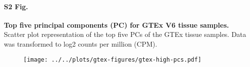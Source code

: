 \documentclass[10pt,letterpaper]{article}
\begin{document}
\paragraph*{S2 Fig.}

\label{figS2}
{\bf Top five principal components (PC) for GTEx V6 tissue samples.} Scatter plot representation of the top five PCs of the GTEx tissue samples. Data was transformed to log2 counts per million (CPM).
\begin{figure}[ht]
\centering
\texttt{[image: ../../plots/gtex-figures/gtex-high-pcs.pdf]}
\end{figure}
\end{document}
